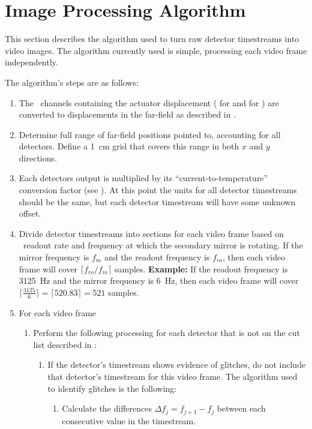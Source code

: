 \section{Image Processing Algorithm} \label{sec:ch7-algo}

This section describes the algorithm used to turn raw detector timestreams into video images.
The algorithm currently used is simple, processing each video frame independently.

The algorithm's steps are as follows:
\begin{enumerate}
\item The  \MCE\ channels containing the actuator displacement ( for  and  for ) are converted to displacements in the far-field as described in .
\item Determine full range of far-field positions pointed to, accounting for all detectors. Define a \SI{1}{\cm} grid that covers this range in both $x$ and $y$ directions.
\item Each detectors output is multiplied by its ``current-to-temperature'' conversion factor (see ). At this point the units for all detector timestreams should be the same, but each detector timestream will have some unknown offset.
\item Divide detector timestreams into sections for each video frame based on \MCE\ readout rate and frequency at which the secondary mirror is rotating.
  If the mirror frequency is $f_m$ and the readout frequency is $f_{ro}$, then each video frame will cover $\lceil f_{ro} / f_{m} \rceil$ samples.
  \textbf{Example:} If the readout frequency is \SI{3125}{\Hz} and the mirror frequency is \SI{6}{\Hz}, then each video frame will cover $\lceil\frac{3125}{6}\rceil = \lceil 520.83 \rceil = 521$ samples.
\item For each video frame
  \begin{enumerate}
  \item Perform the following processing for each detector that is not on the cut list described in :
    \begin{enumerate}
    \item If the detector's timestream shows evidence of glitches, do not include that detector's timestream for this video frame. The algorithm used to identify glitches is the following:
      \begin{enumerate}
      \item Calculate the differences $\Delta f_j = f_{j+1} - f_j$ between each consecutive value in the timestream.

\end{enumerate}
\end{enumerate}
\end{enumerate}
\end{enumerate}
